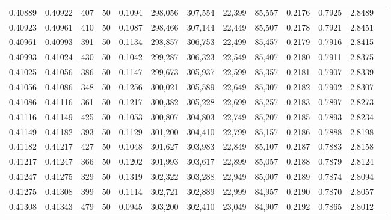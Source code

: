 \begin{tabular}{rrrrrrrrrrrrr}
0.40889 & 0.40922 &   407 &  50 &                                     0.1094 & 298,056 & 307,554 &  22,399 &  85,557 & 0.2176 & 0.7925 & 2.8489 \\
0.40923 & 0.40961 &   410 &  50 &                                     0.1087 & 298,466 & 307,144 &  22,449 &  85,507 & 0.2178 & 0.7921 & 2.8451 \\
0.40961 & 0.40993 &   391 &  50 &                                     0.1134 & 298,857 & 306,753 &  22,499 &  85,457 & 0.2179 & 0.7916 & 2.8415 \\
0.40993 & 0.41024 &   430 &  50 &                                     0.1042 & 299,287 & 306,323 &  22,549 &  85,407 & 0.2180 & 0.7911 & 2.8375 \\
0.41025 & 0.41056 &   386 &  50 &                                     0.1147 & 299,673 & 305,937 &  22,599 &  85,357 & 0.2181 & 0.7907 & 2.8339 \\
0.41056 & 0.41086 &   348 &  50 &                                     0.1256 & 300,021 & 305,589 &  22,649 &  85,307 & 0.2182 & 0.7902 & 2.8307 \\
0.41086 & 0.41116 &   361 &  50 &                                     0.1217 & 300,382 & 305,228 &  22,699 &  85,257 & 0.2183 & 0.7897 & 2.8273 \\
0.41116 & 0.41149 &   425 &  50 &                                     0.1053 & 300,807 & 304,803 &  22,749 &  85,207 & 0.2185 & 0.7893 & 2.8234 \\
0.41149 & 0.41182 &   393 &  50 &                                     0.1129 & 301,200 & 304,410 &  22,799 &  85,157 & 0.2186 & 0.7888 & 2.8198 \\
0.41182 & 0.41217 &   427 &  50 &                                     0.1048 & 301,627 & 303,983 &  22,849 &  85,107 & 0.2187 & 0.7883 & 2.8158 \\
0.41217 & 0.41247 &   366 &  50 &                                     0.1202 & 301,993 & 303,617 &  22,899 &  85,057 & 0.2188 & 0.7879 & 2.8124 \\
0.41247 & 0.41275 &   329 &  50 &                                     0.1319 & 302,322 & 303,288 &  22,949 &  85,007 & 0.2189 & 0.7874 & 2.8094 \\
0.41275 & 0.41308 &   399 &  50 &                                     0.1114 & 302,721 & 302,889 &  22,999 &  84,957 & 0.2190 & 0.7870 & 2.8057 \\
0.41308 & 0.41343 &   479 &  50 &                                     0.0945 & 303,200 & 302,410 &  23,049 &  84,907 & 0.2192 & 0.7865 & 2.8012 \\

\end{tabular}
